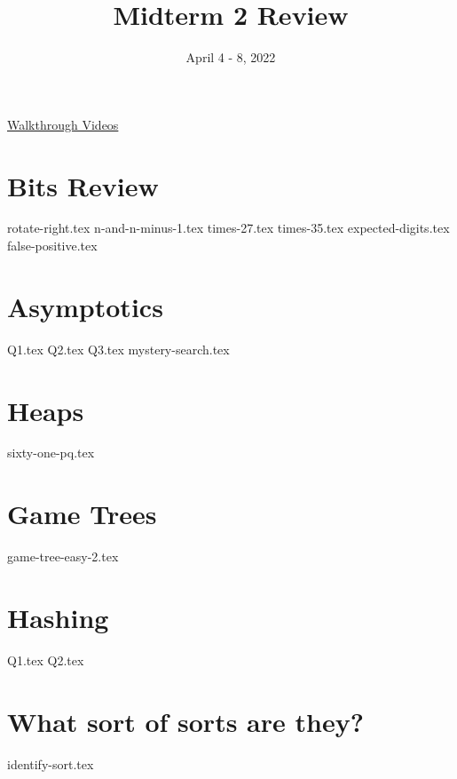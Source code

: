 \documentclass[11pt]{exam}
\title{Midterm 2 Review}
\date{April 4 - 8, 2022}
\begin{document}
\maketitle

\href{https://youtube.com/playlist?list=PLN303KpCz_KSaq-8lYeowmSdLzzNLKWtB}{Walkthrough Videos}

\section{Bits Review}
\begin{questions}
{rotate-right.tex}
{n-and-n-minus-1.tex}
{times-27.tex}
{times-35.tex}
{expected-digits.tex}
{false-positive.tex}

\end{questions}
\clearpage

\section{Asymptotics}
\begin{questions}
{Q1.tex}
{Q2.tex}
\newpage
{Q3.tex}
{mystery-search.tex}

\end{questions}
\clearpage

\section{Heaps}
\begin{questions}
{sixty-one-pq.tex}

\end{questions}
\clearpage

\section{Game Trees}
\begin{questions}
{game-tree-easy-2.tex}

\end{questions}
\clearpage

\section{Hashing}
\begin{questions}
{Q1.tex}
{Q2.tex}

\end{questions}
\clearpage

\section{What sort of sorts are they?}
\begin{questions}
{identify-sort.tex}
\end{questions}
\clearpage

\clearpage
\end{document}
